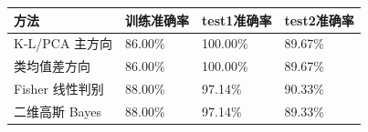 \begin{tabular}{p{3.0cm}p{2.2cm}p{2.2cm}p{2.2cm}}
\toprule
方法 & 训练准确率 & test1准确率 & test2准确率 \\
\midrule
K-L/PCA 主方向 & 86.00\% & 100.00\% & 89.67\% \\
类均值差方向 & 86.00\% & 100.00\% & 89.67\% \\
Fisher 线性判别 & 88.00\% & 97.14\% & 90.33\% \\
二维高斯 Bayes & 88.00\% & 97.14\% & 89.33\% \\
\bottomrule
\end{tabular}
